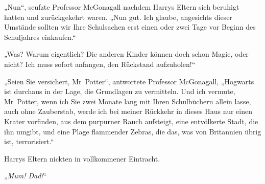 „Nun“, seufzte Professor McGonagall nachdem Harrys Eltern sich beruhigt hatten und zurückgekehrt waren.
„Nun gut. Ich glaube, angesichts dieser Umstände sollten wir Ihre Schulsachen erst einen oder zwei Tage vor Beginn des Schuljahres einkaufen.“

„Was? Warum eigentlich? Die anderen Kinder können doch schon Magie, oder nicht? Ich muss sofort anfangen, den Rückstand aufzuholen!“

„Seien Sie versichert, Mr~Potter“, antwortete Professor McGonagall,
„Hogwarts ist durchaus in der Lage, die Grundlagen zu vermitteln. Und ich vermute, Mr~Potter, wenn ich Sie zwei Monate lang mit Ihren Schulbüchern allein lasse, auch ohne Zauberstab, werde ich bei meiner Rückkehr in dieses Haus nur einen Krater vorfinden, aus dem purpurner Rauch aufsteigt, eine entvölkerte Stadt, die ihn umgibt, und eine Plage flammender Zebras, die das, was von Britannien übrig ist, terrorisiert.“

Harrys Eltern nickten in vollkommener Eintracht.

„\emph{Mum! Dad!}“

